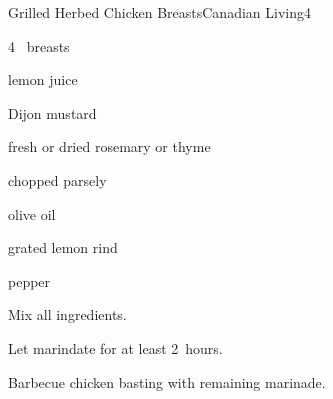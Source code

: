 \begin{recipe}{Grilled Herbed Chicken Breasts}{Canadian Living}{4}

\begin{ingredients}
\item 4~ breasts
\item \C{\half} lemon juice
\item \C{\quarter} Dijon mustard
\item {} fresh or  dried rosemary or thyme
\item {} chopped parsely
\item {} olive oil
\item {} grated lemon rind
\item \tp{\quarter} pepper
\end{ingredients}

\begin{directions}
\item Mix all ingredients.
\item Let marindate for at least 2~hours.
\item Barbecue chicken basting with remaining marinade.
\end{directions}

\end{recipe}
